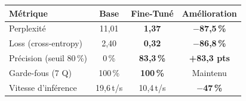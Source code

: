 \documentclass[a0paper, portrait, 25pt]{tikzposter}
\begin{document}
\begin{columns}
{    \vspace{10pt}

    \begin{center}
    \renewcommand{\arraystretch}{1.5}
    \large
    \begin{tabular}{@{} l c c c @{}}
        \toprule
        \textbf{Métrique} & \textbf{Base} & \textbf{Fine-Tuné} & \textbf{Amélioration} \\
        \midrule
        Perplexité
            & 11{,}01 & \cellcolor{resultGreen!25}\textbf{1{,}37}
            & \textcolor{resultGreen}{\textbf{$-$87{,}5\,\%}} \\
        Loss (cross-entropy)
            & 2{,}40 & \cellcolor{resultGreen!25}\textbf{0{,}32}
            & \textcolor{resultGreen}{\textbf{$-$86{,}8\,\%}} \\
        Précision (seuil 80\,\%)
            & 0\,\% & \cellcolor{resultGreen!25}\textbf{83{,}3\,\%}
            & \textcolor{resultGreen}{\textbf{+83{,}3 pts}} \\
        Garde-fous (7 Q)
            & 100\,\% & \cellcolor{resultGreen!25}\textbf{100\,\%}
            & Maintenu \\
        Vitesse d'inférence
            & 19{,}6\,t/s & 10{,}4\,t/s
            & \textcolor{resultOrange}{\textbf{$-$47\,\%}} \\
        \bottomrule
    \end{tabular}
    \end{center}

    \vspace{10pt}

}
\end{columns}
\end{document}
